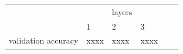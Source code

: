 \documentclass{exam}
\begin{document}
\begin{questions}
        \begin{table}[h!]
            \centering
            \begin{tabular}{l|lllll}
                                &                                     & layers                      &                 &  &  \\ \cline{2-4}
                                & \multicolumn{1}{l|}{1}          & \multicolumn{1}{l|}{2}          & 3           &  &  \\ \cline{1-4}
            validation accuracy & \multicolumn{1}{l|}{xxxx} & \multicolumn{1}{l|}{xxxx} & xxxx &  & 
            \end{tabular}
        \end{table}


    \end{questions}
\end{document}
